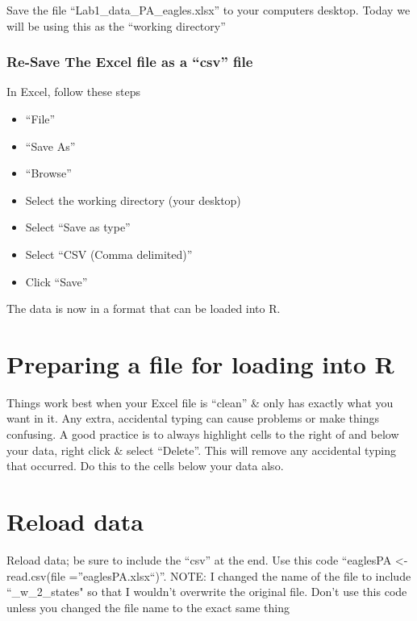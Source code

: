 \documentclass[]{book}
\providecommand{\tightlist}{%
  \setlength{\itemsep}{0pt}\setlength{\parskip}{0pt}}
\theoremstyle{definition}
\theoremstyle{definition}
\theoremstyle{definition}
\theoremstyle{remark}
\begin{document}
Save the file ``Lab1\_data\_PA\_eagles.xlsx'' to your computers desktop.
Today we will be using this as the ``working directory''

\subsubsection{\texorpdfstring{Re-Save The Excel file as a ``csv''
file}{Re-Save The Excel file as a csv file}}\label{re-save-the-excel-file-as-a-csv-file}

In Excel, follow these steps

\begin{itemize}
\tightlist
\item
  ``File''
\item
  ``Save As''
\item
  ``Browse''
\item
  Select the working directory (your desktop)
\item
  Select ``Save as type''
\item
  Select ``CSV (Comma delimited)''
\item
  Click ``Save''
\end{itemize}

The data is now in a format that can be loaded into R.

\section{Preparing a file for loading into
R}\label{preparing-a-file-for-loading-into-r}

Things work best when your Excel file is ``clean'' \& only has exactly
what you want in it. Any extra, accidental typing can cause problems or
make things confusing. A good practice is to always highlight cells to
the right of and below your data, right click \& select ``Delete''. This
will remove any accidental typing that occurred. Do this to the cells
below your data also.

\section{Reload data}\label{reload-data}

Reload data; be sure to include the ``csv'' at the end. Use this code
``eaglesPA \textless{}- read.csv(file =''eaglesPA.xlsx``)''. NOTE: I
changed the name of the file to include ``\_w\_2\_states" so that I
wouldn't overwrite the original file. Don't use this code unless you
changed the file name to the exact same thing
\end{document}
